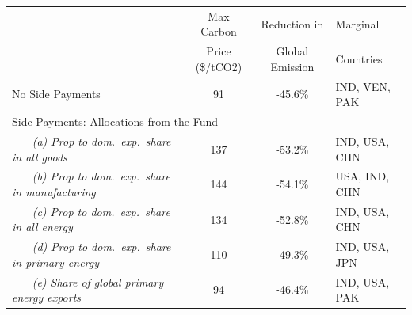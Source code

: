 \begin{center}
\small
\setlength{\tabcolsep}{4pt}
\renewcommand{\arraystretch}{1.25}
\begin{tabular}{l cc l}
\hline
 & Max Carbon & Reduction in  & Marginal \\
 & Price (\$/tCO2) & Global Emission & Countries \\
\hline
 No Side Payments & 91 & -45.6\% & IND, VEN, PAK \\
\multicolumn{4}{l}{Side Payments: Allocations from the Fund} \\
 ~~~ \textit{(a) Prop to dom.\ exp.\ share in all goods} & 137 & -53.2\% & IND, USA, CHN \\
 ~~~ \textit{(b) Prop to dom.\ exp.\ share in manufacturing} & 144 & -54.1\% & USA, IND, CHN \\
 ~~~ \textit{(c) Prop to dom.\ exp.\ share in all energy} & 134 & -52.8\% & IND, USA, CHN \\
 ~~~ \textit{(d) Prop to dom.\ exp.\ share in primary energy} & 110 & -49.3\% & IND, USA, JPN \\
 ~~~ \textit{(e) Share of global primary energy exports} & 94 & -46.4\% & IND, USA, PAK \\
\hline
\end{tabular}
\end{center}
